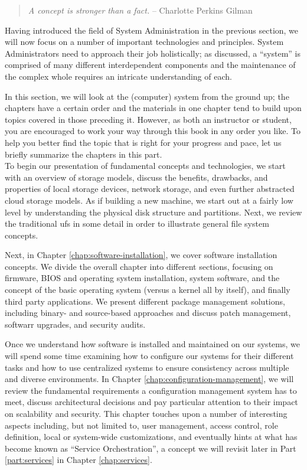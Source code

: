 \begin{quote}
{\em A concept is stronger than a fact.}
-- Charlotte Perkins Gilman
\end{quote}

Having introduced the field of System Administration
in the previous section, we will now focus on a number
of important technologies and principles.  System
Administrators need to approach their job
holistically; as discussed, a ``system'' is comprised
of many different interdependent components and the
maintenance of the complex whole requires an intricate
understanding of each.

In this section, we will look at the (computer) system
from the ground up; the chapters have a certain order
and the materials in one chapter tend to build upon
topics covered in those preceding it.  However, as
both an instructor or student, you are encouraged to
work your way through this book in any order you like.
To help you better find the topic that is right for
your progress and pace, let us briefly summarize the
chapters in this part. \\

To begin our presentation of fundamental concepts and
technologies, we start with an overview of storage
models, discuss the benefits, drawbacks, and
properties of local storage devices, network storage,
and even further abstracted cloud storage models.  As if building a new machine, we
start out at a fairly low level by understanding the
physical disk structure and partitions.  Next, we
review the traditional \gls{ufs} in some detail in order to illustrate general
file system concepts.

Next, in Chapter \ref{chap:software-installation}, we
cover software installation concepts.  We divide the
overall chapter into different sections, focusing on
firmware, BIOS and operating system installation,
system software, and the concept of the basic
operating system (versus a kernel all by itself), and
finally third party applications.  We present
different package management solutions, including
binary- and source-based approaches and discuss patch
management, softwarr upgrades, and security audits.

Once we understand how software is installed and
maintained on our systems, we will spend some time
examining how to configure our systems for their
different tasks and how to use centralized systems
to ensure consistency across multiple and diverse
environments.  In Chapter
\ref{chap:configuration-management}, we will review
the fundamental requirements a configuration
management system has
to meet, discuss architectural decisions and pay
particular attention to their impact on scalability
and security.  This chapter touches upon a number of
interesting aspects including, but not limited to,
user management, access control, role definition,
local or system-wide customizations, and eventually
hints at what has become known as ``Service
Orchestration'', a
concept we will revisit later in Part
\ref{part:services} in Chapter \ref{chap:services}.

